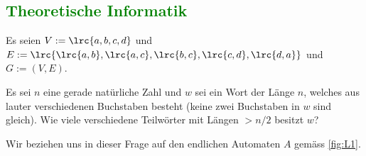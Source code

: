 \begin{questions}
	\section*{\textcolor{Green}{Theoretische Informatik}}
	\question
	\droptotalpoints
	\vspace{4cm}

	\question Es seien $V := \lrc{a,b,c,d}$ und $E := \lrc{\lrc{a,b},\lrc{a,c},\lrc{b,c},\lrc{c,d},\lrc{d,a}}$ und $G := (V,E)$.
	\droptotalpoints

	\clearpage
	\question[2] Es sei $n$ eine gerade natürliche Zahl und $w$ sei ein Wort der Länge $n$, welches aus lauter verschiedenen Buchstaben besteht (keine zwei Buchstaben in $w$ sind gleich). Wie viele verschiedene Teilwörter mit Längen $>n/2$ besitzt $w$?

	\droptotalpoints

	\clearpage
	\question Wir beziehen uns in dieser Frage auf den endlichen Automaten $A$ gemäss \cref{fig:L1}.


\end{questions}
